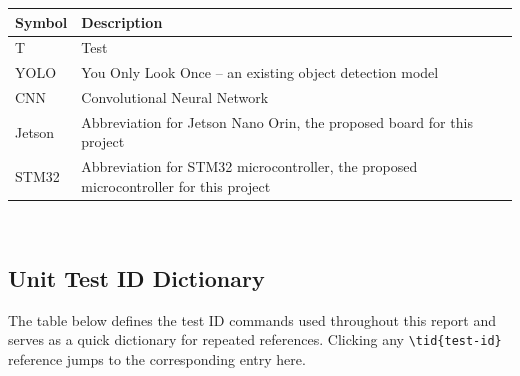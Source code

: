 \documentclass[12pt, titlepage]{article}
\begin{document}
\renewcommand{\arraystretch}{1.2}
\begin{tabularx}{\textwidth}{p{3cm}X}
  \toprule
  \textbf{Symbol} & \textbf{Description}                                                                  \\
  \midrule
  T               & Test                                                                                  \\
  YOLO            & You Only Look Once -- an existing object detection model                              \\
  CNN             & Convolutional Neural Network                                                          \\
  Jetson          & Abbreviation for Jetson Nano Orin, the proposed board for this project                \\
  STM32           & Abbreviation for STM32 microcontroller, the proposed microcontroller for this project \\
  \bottomrule
\end{tabularx}\\

\subsection{Unit Test ID Dictionary}
\label{sec:unit_test_dict}

The table below defines the test ID commands used throughout this report and
serves as a quick dictionary for repeated references. Clicking any
\texttt{\textbackslash tid\{test-id\}} reference jumps to the corresponding
entry here.
\end{document}
